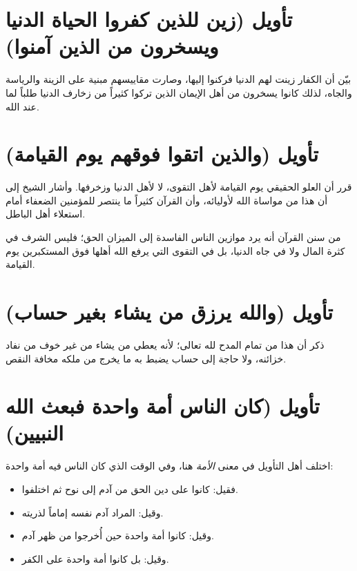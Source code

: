 \separator

\section{تأويل (زين للذين كفروا الحياة الدنيا ويسخرون من الذين آمنوا)}
بيّن  أن الكفار زينت لهم الدنيا فركنوا إليها، وصارت مقاييسهم مبنية على الزينة والرياسة والجاه، لذلك كانوا يسخرون من أهل الإيمان الذين تركوا كثيراً من زخارف الدنيا طلباً لما عند الله.

\section{تأويل (والذين اتقوا فوقهم يوم القيامة)}
قرر  أن العلو الحقيقي يوم القيامة لأهل التقوى، لا لأهل الدنيا وزخرفها. وأشار الشيخ إلى أن هذا من مواساة الله لأوليائه، وأن القرآن كثيراً ما ينتصر للمؤمنين الضعفاء أمام استعلاء أهل الباطل.

\begin{fawaid}
من سنن القرآن أنه يرد موازين الناس الفاسدة إلى الميزان الحق؛ فليس الشرف في كثرة المال ولا في جاه الدنيا، بل في التقوى التي يرفع الله أهلها فوق المستكبرين يوم القيامة.
\end{fawaid}

\section{تأويل (والله يرزق من يشاء بغير حساب)}
ذكر  أن هذا من تمام المدح لله تعالى؛ لأنه يعطي من يشاء من غير خوف من نفاد خزائنه، ولا حاجة إلى حساب يضبط به ما يخرج من ملكه مخافة النقص.

\separator

\section{تأويل (كان الناس أمة واحدة فبعث الله النبيين)}
 اختلف أهل التأويل في معنى \textit{الأمة} هنا، وفي الوقت الذي كان الناس فيه أمة واحدة:
\begin{itemize}
    \item فقيل: كانوا على دين الحق من آدم إلى نوح ثم اختلفوا.
    \item وقيل: المراد آدم نفسه إماماً لذريته.
    \item وقيل: كانوا أمة واحدة حين أُخرجوا من ظهر آدم.
    \item وقيل: بل كانوا أمة واحدة على الكفر.
\end{itemize}

